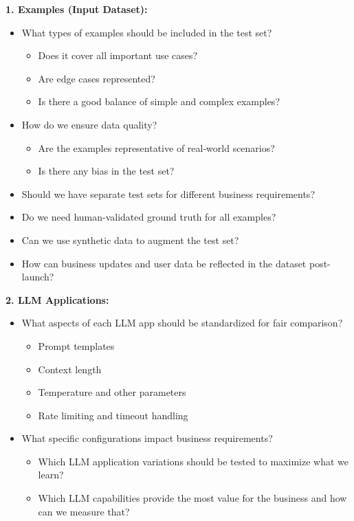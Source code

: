 \textbf{1. Examples (Input Dataset):}
\begin{itemize}
    \item What types of examples should be included in the test set?
    \begin{itemize}
        \item Does it cover all important use cases?
        \item Are edge cases represented?
        \item Is there a good balance of simple and complex examples?
    \end{itemize}
    \item How do we ensure data quality?
    \begin{itemize}
        \item Are the examples representative of real-world scenarios?
        \item Is there any bias in the test set?
    \end{itemize}
    \item Should we have separate test sets for different business requirements?
    \item Do we need human-validated ground truth for all examples?
    \item Can we use synthetic data to augment the test set?
    \item How can business updates and user data be reflected in the dataset post-launch?
\end{itemize}

\textbf{2. LLM Applications:}
\begin{itemize}
    \item What aspects of each LLM app should be standardized for fair comparison?
    \begin{itemize}
        \item Prompt templates
        \item Context length
        \item Temperature and other parameters
        \item Rate limiting and timeout handling
    \end{itemize}
    \item What specific configurations impact business requirements?
    \begin{itemize}
        \item Which LLM application variations should be tested to maximize what we learn?
        \item Which LLM capabilities provide the most value for the business and how can we measure that?
    \end{itemize}
\end{itemize}

